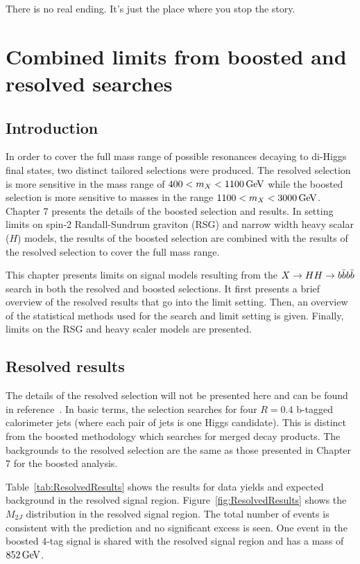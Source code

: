 \begin{savequote}[75mm]
There is no real ending. It’s just the place where you stop the story. 
\end{savequote}

\chapter{Combined limits from boosted and resolved searches}
\label{chap:4bcomb}

\section{Introduction}

In order to cover the full mass range of possible resonances decaying to di-Higgs final states, two distinct tailored selections were produced. The resolved selection is more sensitive in the mass range of $400 < m_{X} < 1100 \GeV$ while the boosted selection is more sensitive to masses in the range $1100 < m_{X} < 3000 \GeV$. Chapter 7 presents the details of the boosted selection and results. In setting limits on spin-2 Randall-Sundrum graviton (RSG) and narrow width heavy scalar ($H$) models, the results of the boosted selection are combined with the results of the resolved selection to cover the full mass range.

This chapter presents limits on signal models resulting from the $X\to HH \to b\bar{b}b\bar{b}$ search in both the resolved and boosted selections. It first presents a brief overview of the resolved results that go into the limit setting. Then, an overview of the statistical methods used for the search and limit setting is given. Finally, limits on the RSG and heavy scaler models are presented. 

\section{Resolved results}

The details of the resolved selection will not be presented here and can be found in reference~\cite{4bconf}. In basic terms, the selection searches for four $R = 0.4$ b-tagged calorimeter jets (where each pair of jets is one Higgs candidate). This is distinct from the boosted methodology which searches for merged decay products. The backgrounds to the resolved selection are the same as those presented in Chapter 7 for the boosted analysis. 

Table~\ref{tab:ResolvedResults} shows the results for data yields and expected background in the resolved signal region. Figure~\ref{fig:ResolvedResults} shows the $M_{2J}$ distribution in the resolved signal region. The total number of events is consistent with the prediction and no significant excess is seen. One event in the boosted $4$-tag signal is shared with the resolved signal region and has a mass of $852 \GeV$. 


